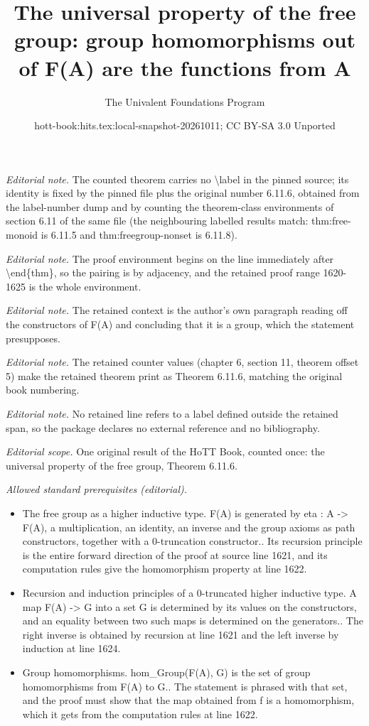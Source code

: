 \documentclass[10pt,a4paper]{article}
\title{The universal property of the free group: group homomorphisms out of F(A) are the functions from A}
\author{The Univalent Foundations Program}
\date{hott-book:hits.tex:local-snapshot-20261011; CC BY-SA 3.0 Unported}
\newcounter{chapter}
\theoremstyle{definition}
\theoremstyle{remark}
\numberwithin{equation}{section}
\begin{document}
\maketitle
\setcounter{chapter}{6}
\setcounter{section}{11}
\setcounter{thm}{5}
\noindent\textit{Editorial note.} The counted theorem carries no \textbackslash{}label in the pinned source; its identity is fixed by the pinned file plus the original number 6.11.6, obtained from the label-number dump and by counting the theorem-class environments of section 6.11 of the same file (the neighbouring labelled results match: thm:free-monoid is 6.11.5 and thm:freegroup-nonset is 6.11.8).\par\medskip
\noindent\textit{Editorial note.} The proof environment begins on the line immediately after \textbackslash{}end\{thm\}, so the pairing is by adjacency, and the retained proof range 1620-1625 is the whole environment.\par\medskip
\noindent\textit{Editorial note.} The retained context is the author's own paragraph reading off the constructors of F(A) and concluding that it is a group, which the statement presupposes.\par\medskip
\noindent\textit{Editorial note.} The retained counter values (chapter 6, section 11, theorem offset 5) make the retained theorem print as Theorem 6.11.6, matching the original book numbering.\par\medskip
\noindent\textit{Editorial note.} No retained line refers to a label defined outside the retained span, so the package declares no external reference and no bibliography.\par\medskip
\noindent\textit{Editorial scope.} One original result of the HoTT Book, counted once: the universal property of the free group, Theorem 6.11.6.\par\medskip
\noindent\textit{Allowed standard prerequisites (editorial).}\begin{itemize}
\item The free group as a higher inductive type. F(A) is generated by eta : A -> F(A), a multiplication, an identity, an inverse and the group axioms as path constructors, together with a 0-truncation constructor.. Its recursion principle is the entire forward direction of the proof at source line 1621, and its computation rules give the homomorphism property at line 1622.
\item Recursion and induction principles of a 0-truncated higher inductive type. A map F(A) -> G into a set G is determined by its values on the constructors, and an equality between two such maps is determined on the generators.. The right inverse is obtained by recursion at line 1621 and the left inverse by induction at line 1624.
\item Group homomorphisms. hom\_Group(F(A), G) is the set of group homomorphisms from F(A) to G.. The statement is phrased with that set, and the proof must show that the map obtained from f is a homomorphism, which it gets from the computation rules at line 1622.
\end{itemize}\medskip
\end{document}
